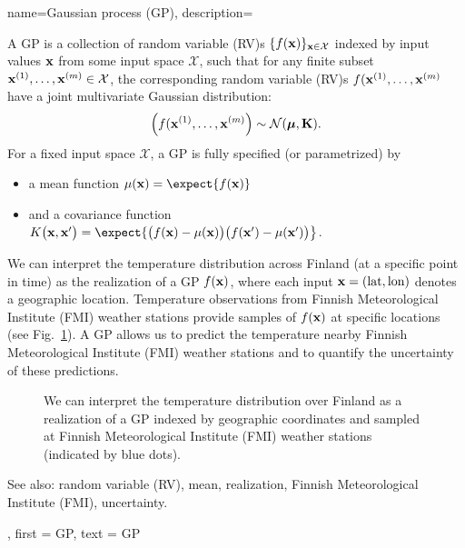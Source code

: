 {name={Gaussian process (GP)},
  description={A GP is a collection of random variable (RV)s 
  	$\{f({\bf x})\}_{{\bf x} \in \mathcal{X}}$ indexed by input values ${\bf x}$ 
  	from some input space $\mathcal{X}$, such that for any finite subset 
  	${\bf x}^{(1)}, \ldots, {\bf x}^{(m)} \in \mathcal{X}$, 
  	the corresponding random variable (RV)s $f({\bf x}^{(1)}, \ldots, {\bf x}^{(m)}$ have a joint 
  	multivariate Gaussian distribution:
  	\[
  	\left( f({\bf x}^{(1)}, \ldots, {\bf x}^{(m)} \right) \sim \mathcal{N}(\boldsymbol{\mu}, \mathbf{K}).
  	\]
  	For a fixed input space $\mathcal{X}$, a GP is fully specified (or parametrized) by 
  	\begin{itemize}
  		\item a mean function $\mu({\bf x}) = \expect\{ f({\bf x})\}$
  		\item and a covariance function $K\big({\bf x},{\bf x}'\big)= \expect\{ \big(f({\bf x})-\mu({\bf x})\big) \big(f({\bf x}')-\mu({\bf x}')\big) \big\}$.
  	\end{itemize}
  	 We can interpret the temperature distribution across Finland (at a specific 
  	point in time) as the realization of a GP $f({\bf x})$, where each input ${\bf x} = (\text{lat}, \text{lon})$ 
  	denotes a geographic location. Temperature observations from Finnish Meteorological Institute (FMI) weather stations provide 
  	samples of $f({\bf x})$ at specific locations (see Fig.\ \ref{fig_gp_FMI}). A GP allows us to 
  	predict the temperature nearby Finnish Meteorological Institute (FMI) weather stations and to quantify the uncertainty 
  	of these predictions. 
  	\begin{figure}[H]
  	\begin{center}
\vspace*{-15mm}
\end{center}
\caption{We can interpret the temperature distribution over Finland as a realization 
	of a GP indexed by geographic coordinates and sampled at Finnish Meteorological Institute (FMI) weather stations (indicated by 
	blue dots). \label{fig_gp_FMI}}
\end{figure}
See also: random variable (RV), mean, realization, Finnish Meteorological Institute (FMI), uncertainty.}, 
first = {GP}, 
text = {GP}
}

